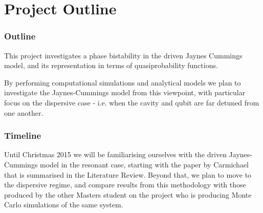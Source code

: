 
\part{Project Outline}
\section{Outline}
This project investigates a phase bistability in the driven Jaynes Cummings model, and its representation in terms of quasiprobability functions.

By performing computational simulations and analytical models we plan to investigate the Jaynes-Cummings model from this viewpoint, with particular focus on the dispersive case - i.e. when the cavity and qubit are far detuned from one another.
\section{Timeline}
Until Christmas 2015 we will be familiarising ourselves with the driven Jaynes-Cummings model in the resonant case, starting with the paper by Carmichael that is summarised in the Literature Review. Beyond that, we plan to move to the dispersive regime, and compare results from this methodology with those produced by the other Masters student on the project who is producing Monte Carlo simulations of the same system.


